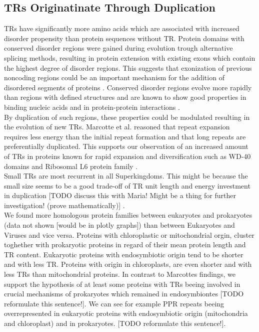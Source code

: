 \documentclass[a4,center,fleqn]{NAR}
\begin{document}
\subsection{TRs Originatinate Through Duplication}
TRs have significantly more amino acids which are associated with increased disorder propensity than protein sequences without TR. 
Protein domains with conserved disorder regions were gained during evolution trough alternative splicing methods, resulting in protein extension with existing exons which contain the highest degree of disorder regions. This suggests that exonization of previous noncoding regions could be an important mechanism for the addition of disordered segments of proteins \cite{Krisentseva2003, Romero2006, Hegyi2011, Buljan2012, Barbosa2012}.
Conserved disorder regions evolve more rapidly than regions with defined structures and are known to show good properties in binding nucleic acids and in protein-protein interactions \cite{Chen2006}. \\
By duplication of such regions, these properties could be modulated resulting in the evolution of new TRs.
Marcotte et al. reasoned that repeat expansion requires less energy than the initial repeat formation and that long repeats are preferentially duplicated. 
This supports our observation of an increased amount of TRs in proteins known for rapid expansion and diversification such as WD-40 domains and Ribosomal L6 protein family \cite{Smith1999, Golden1993}.\\
Small TRs are most recurrent in all Superkingdoms. This might be because the small size seems to be a good trade-off of TR unit length and energy investment in duplication [TODO discuss this with Maria! Might be a thing for further investigation! (prove mathematically)] \cite{Andrade2001}.\\
We found more homologous protein families between eukaryotes and prokaryotes (data not shown [would be in plotly graphs]) than between Eukaryotes and Viruses and vice versa. 
Proteins with chloroplastic or mitochondrial orgin, cluster toghether with prokaryotic proteins in regard of their mean protein length and TR content. 
Eukaryotic proteins with endosymbiotic origin tend to be shorter and with less TR. Proteins with origin in chloroplasts, are even shorter and with less TRs than mitochondrial proteins. In contrast to Marcottes \cite{Marcotte1999} findings, we support the hypothesis of at least some proteins with TRs beeing involved in crucial mechanisms of prokaryotes which remained in endosymbiontes [TODO reformulate this sentence!]. We can see for example PPR repeats beeing overrepresented in eukaryotic proteins with endosymbiotic origin (mitochondria and chloroplast) and in prokaryotes. [TODO reformulate this sentence!].
\end{document}
